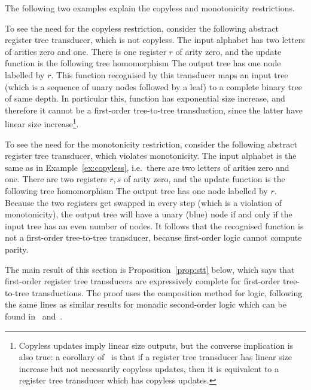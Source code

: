The following two examples explain the copyless and monotonicity restrictions. 
\begin{example}\label{ex:copyless}
    To see the need for the copyless restriction, consider the following abstract register tree transducer, which is not copyless. The input alphabet has two letters of arities zero and one. There is one register $r$ of arity zero, and the update function is the following tree homomorphism 
The output tree has one node labelled by  $r$. This function recognised by this transducer maps an input tree (which is a sequence of unary nodes followed by a leaf)  to a complete binary tree of same depth. In particular this, function has exponential size increase, and therefore it cannot be a first-order tree-to-tree transduction, since the latter have linear size increase\footnote{Copyless updates imply linear size outputs, but the converse implication is also true: a corollary of~\cite[Theorem 7.1]{engelfriet_macro_2003} is that  if a  register tree transducer has linear size increase but not necessarily copyless updates, then it is equivalent to a register tree transducer   which has copyless updates.}.
\end{example}

\begin{example}\label{ex:monotone}
    To see the need for the monotonicity restriction, consider the following abstract register tree transducer, which violates monotonicity. The input alphabet is the same as in Example~\ref{ex:copyless}, i.e.~there are two letters of arities zero and one. There are two registers $r,s$ of arity zero, and the update function is the following tree homomorphism 
    The output tree has one node labelled by  $r$. 
Because the two registers get swapped in every step (which is a violation of monotonicity), the output  tree will have a unary (blue)  node if and only if the input tree has an even number of nodes. It follows that the recognised function is not a first-order tree-to-tree transducer, because first-order logic cannot compute parity. 
\end{example}

The main result of this section is Proposition~\ref{prop:stt} below, which says that first-order register tree transducers are expressively complete for first-order tree-to-tree transductions. The proof uses the composition method for logic,  following the same lines as  similar results for monadic second-order logic which can be found in~\cite[Theorem 4.6]{alur2017streaming} and~\cite[Theorem 14]{bloem_comparison_2000}. 

